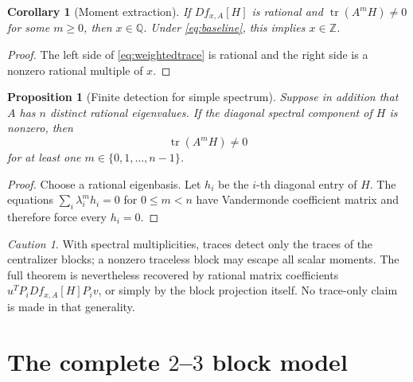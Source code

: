 \documentclass[11pt,oneside]{article}
\newtheorem{proposition}[theorem]{Proposition}
\newtheorem{corollary}[theorem]{Corollary}
\theoremstyle{definition}
\theoremstyle{remark}
\newtheorem{warning}[theorem]{Caution}
\newcommand{\Z}{\mathbb Z}
\newcommand{\Q}{\mathbb Q}
\newcommand{\tr}{\operatorname{tr}}
\begin{document}
\begin{corollary}[Moment extraction]
\label{cor:momentextraction}
If $Df_{x,A}[H]$ is rational and $\tr(A^mH)\ne0$ for some $m\ge0$, then $x\in\Q$.
Under \eqref{eq:baseline}, this implies $x\in\Z$.
\end{corollary}

\begin{proof}
The left side of \eqref{eq:weightedtrace} is rational and the right side is a nonzero rational
multiple of $x$.
\end{proof}

\begin{proposition}[Finite detection for simple spectrum]
\label{prop:finitedetection}
Suppose in addition that $A$ has $n$ distinct rational eigenvalues.  If the diagonal spectral
component of $H$ is nonzero, then
\[
 \tr(A^mH)\ne0
\]
for at least one $m\in\{0,1,\dots,n-1\}$.
\end{proposition}

\begin{proof}
Choose a rational eigenbasis.  Let $h_i$ be the $i$-th diagonal entry of $H$.  The equations
$\sum_i\lambda_i^m h_i=0$ for $0\le m<n$ have Vandermonde coefficient matrix and therefore
force every $h_i=0$.
\end{proof}

\begin{warning}
With spectral multiplicities, traces detect only the traces of the centralizer blocks; a
nonzero traceless block may escape all scalar moments.  The full theorem is nevertheless
recovered by rational matrix coefficients $u^TP_iDf_{x,A}[H]P_iv$, or simply by the block
projection itself.  No trace-only claim is made in that generality.
\end{warning}

\section{The complete \texorpdfstring{$2$--$3$}{2--3} block model}
\label{sec:twothreemodel}
\end{document}
